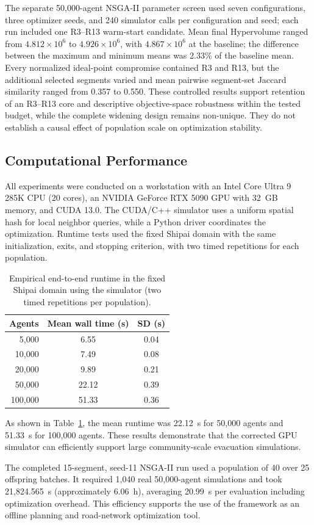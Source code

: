 \documentclass[preprint,12pt]{elsarticle}
\newcommand{\revfloat}{\color{blue}\captionsetup{font={color=blue},labelfont={color=blue}}}
\begin{document}
{The separate 50,000-agent NSGA-II parameter screen used seven configurations, three optimizer seeds, and 240 simulator calls per configuration and seed; each run included one R3--R13 warm-start candidate. Mean final Hypervolume ranged from $4.812\times10^6$ to $4.926\times10^6$, with $4.867\times10^6$ at the baseline; the difference between the maximum and minimum means was 2.33\% of the baseline mean. Every normalized ideal-point compromise contained R3 and R13, but the additional selected segments varied and mean pairwise segment-set Jaccard similarity ranged from 0.357 to 0.550. These controlled results support retention of an R3--R13 core and descriptive objective-space robustness within the tested budget, while the complete widening design remains non-unique. They do not establish a causal effect of population scale on optimization stability.


\FloatBarrier
}

{\color{blue}
\subsection{Computational Performance}
\label{sec:computational_performance}

All experiments were conducted on a workstation with an Intel Core Ultra 9 285K CPU (20 cores), an NVIDIA GeForce RTX
5090 GPU with 32~GB memory, and CUDA 13.0. The CUDA/C++ simulator uses a uniform spatial hash
for local neighbor queries, while a Python driver coordinates the optimization. Runtime tests used the fixed Shipai domain
with the same initialization, exits, and stopping criterion, with two timed repetitions for each population.

\begin{table}[htbp]
\centering
\revfloat
\caption{Empirical end-to-end runtime in the fixed Shipai domain using the simulator (two timed repetitions per population).}
\label{tab:runtime_scaling}
\begin{tabular}{rcc}
\toprule
Agents & Mean wall time (s) & SD (s) \\
\midrule
5,000 & 6.55 & 0.04 \\
10,000 & 7.49 & 0.08 \\
20,000 & 9.89 & 0.21 \\
50,000 & 22.12 & 0.39 \\
100,000 & 51.33 & 0.36 \\
\bottomrule
\end{tabular}
\end{table}

As shown in Table~\ref{tab:runtime_scaling}, the mean runtime was 22.12~s for 50,000 agents and 51.33~s for 100,000 agents.
These results demonstrate that the corrected GPU simulator can efficiently support large community-scale evacuation
simulations.

The completed 15-segment, seed-11 NSGA-II run used a population of 40 over 25 offspring batches. It required 1,040 real
50,000-agent simulations and took 21,824.565~s (approximately 6.06~h), averaging 20.99~s per evaluation including
optimization overhead. This efficiency supports the use of the framework as an offline planning and road-network
optimization tool.
\FloatBarrier
}
\end{document}

